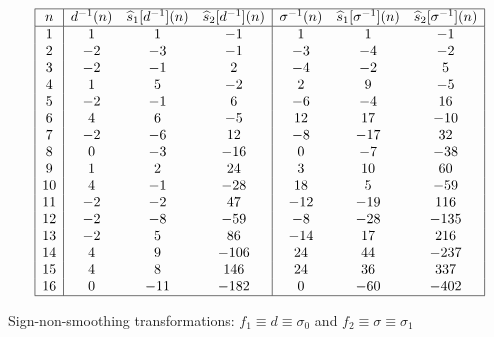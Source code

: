 \documentclass[12pt,reqno,a4letter]{article}
\numberwithin{figure}{section}
\numberwithin{table}{section}
\numberwithin{equation}{section}
\theoremstyle{plain}
\numberwithin{theorem}{section}
\theoremstyle{definition}
\begin{document}
\begin{table}[h!]
\begin{equation*}
\begin{array}{|c|ccc|ccc|} 
 \hline
 n & d^{-1}(n) & \widehat{s}_1[d^{-1}](n) & \widehat{s}_2[d^{-1}](n) & 
     \sigma^{-1}(n) & \widehat{s}_1[\sigma^{-1}](n) & 
     \widehat{s}_2[\sigma^{-1}](n) \\ \hline
 1 & 1 & 1 & -1 & 1 & 1 & -1 \\
 2 & -2 & -3 & -1 & -3 & -4 & -2 \\
 3 & -2 & -1 & 2 & -4 & -2 & 5 \\
 4 & 1 & 5 & -2 & 2 & 9 & -5 \\
 5 & -2 & -1 & 6 & -6 & -4 & 16 \\
 6 & 4 & 6 & -5 & 12 & 17 & -10 \\
 7 & -2 & -6 & 12 & -8 & -17 & 32 \\
 8 & 0 & -3 & -16 & 0 & -7 & -38 \\
 9 & 1 & 2 & 24 & 3 & 10 & 60 \\
 10 & 4 & -1 & -28 & 18 & 5 & -59 \\
 11 & -2 & -2 & 47 & -12 & -19 & 116 \\
 12 & -2 & -8 & -59 & -8 & -28 & -135 \\
 13 & -2 & 5 & 86 & -14 & 17 & 216 \\
 14 & 4 & 9 & -106 & 24 & 44 & -237 \\
 15 & 4 & 8 & 146 & 24 & 36 & 337 \\
 16 & 0 & -11 & -182 & 0 & -60 & -402 \\
 \hline
\end{array}
\end{equation*}
\caption{Sign-non-smoothing transformations: $f_1 \equiv d \equiv \sigma_0$ and $f_2 \equiv \sigma \equiv \sigma_1$}
\label{table_s12Hatfn_SignSmoothingTF_v2}
\end{table}
\end{document}
